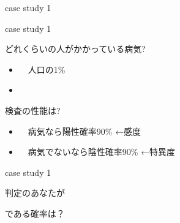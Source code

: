 \documentclass[
  ignorenonframetext,
  aspectratio=169]{beamer}
\begin{document}
\begin{frame}{}
\protect\hypertarget{section}{}
\Huge

\scalebox{1.4}{\textcolor{softblue}{事例1}}
\end{frame}

\begin{frame}{case study 1}
\protect\hypertarget{case-study-1}{}
\Huge
\centering


\vspace*{-58pt}
\pause
{}
\end{frame}

\begin{frame}{case study 1}
\protect\hypertarget{case-study-1-1}{}
\LARGE

どれくらいの人がかかっている病気? \pause

\begin{itemize}
  \item 　\textbullet{}\hspace{2pt}人口の1\%
  \item 
  \end{itemize}
\pause

検査の性能は? \pause

\begin{itemize}
  \item 　\textbullet{}\hspace{2pt}病気なら陽性確率90\%\pause
  \textcolor{gentlered}{←感度}
  \pause
  \item 　\textbullet{}\hspace{2pt}病気でないなら陰性確率90\%\pause
  \textcolor{softblue}{←特異度}
  \end{itemize}
\end{frame}

\begin{frame}{case study 1}
\protect\hypertarget{case-study-1-2}{}
\Huge
\raggedleft

判定のあなたが

\par
\vspace*{-20pt}\pause
\scalebox{1}{\textcolor{red!60}{ほんとうに}}\par
\pause

\scalebox{1.4}{\textcolor{red!60}{病気}}である確率は？
\end{frame}
\end{document}
